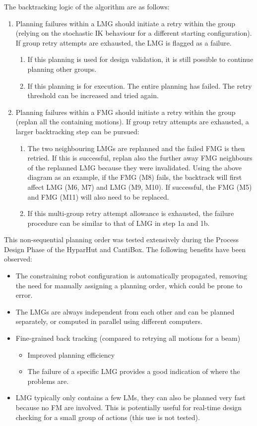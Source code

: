 The backtracking logic of the algorithm are as follows:
\begin{enumerate}
    \item Planning failures within a LMG should initiate a retry within the group (relying on the stochastic IK behaviour for a different starting configuration). If group retry attempts are exhausted, the LMG is flagged as a failure.
    \begin{enumerate}
        \item If this planning is used for design validation, it is still possible to continue planning other groups.
        \item If this planning is for execution. The entire planning has failed. The retry threshold can be increased and tried again.
    \end{enumerate}
    \item Planning failures within a FMG should initiate a retry within the group (replan all the containing motions). If group retry attempts are exhausted, a larger backtracking step can be pursued:
    \begin{enumerate}
        \item The two neighbouring LMGs are replanned and the failed FMG is then retried. If this is successful, replan also the further away FMG neighbours of the replanned LMG because they were invalidated. Using the above diagram as an example, if the FMG (M8) fails, the backtrack will first affect LMG (M6, M7) and LMG (M9, M10). If successful, the FMG (M5) and FMG (M11) will also need to be replaced.
        \item If this multi-group retry attempt allowance is exhausted, the failure procedure can be similar to that of LMG in step 1a and 1b.
    \end{enumerate}
\end{enumerate}

This non-sequential planning order was tested extensively during the Process Design Phase of the HyparHut and CantiBox. The following benefits have been observed:
\begin{itemize}
    \item The constraining robot configuration is automatically propagated, removing the need for manually assigning a planning order, which could be prone to error.
    \item The LMGs are always independent from each other and can be planned separately, or computed in parallel using different computers.
    \item Fine-grained back tracking (compared to retrying all motions for a beam)
    \begin{itemize}
        \item Improved planning efficiency
        \item The failure of a specific LMG provides a good indication of where the problems are.
    \end{itemize}
    \item LMG typically only contains a few LMs, they can also be planned very fast because no FM are involved. This is potentially useful for real-time design checking for a small group of actions (this use is not tested).
\end{itemize}

